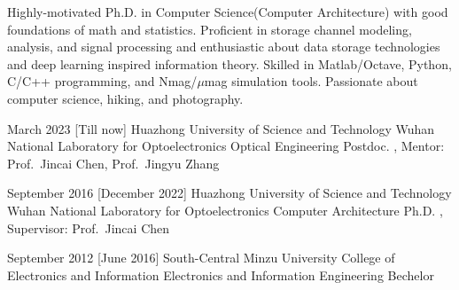 \documentclass[en]{resume}
\begin{document}
\makeheader

Highly-motivated Ph.D. in Computer Science(Computer Architecture)
with good foundations of math and statistics.
Proficient in storage channel modeling, analysis, and signal processing
and enthusiastic about data storage technologies and deep learning inspired information theory.
Skilled in Matlab/Octave, Python, C/C++ programming, and Nmag/$\mu$mag simulation tools.
Passionate about computer science, hiking, and photography.


\begin{educations}
  \education%
  {March 2023}%
    [Till now]%
    {Huazhong University of Science and Technology}%
    {Wuhan National Laboratory for Optoelectronics}%
    {Optical Engineering}%
    {Postdoc.}%
    {, Mentor: Prof.~Jincai Chen, Prof.~Jingyu Zhang}%

  \separator{0.5ex}
  \education%
    {September 2016}%
    [December 2022]%
    {Huazhong University of Science and Technology}%
    {Wuhan National Laboratory for Optoelectronics}%
    {Computer Architecture}%
    {Ph.D.}%
    {, Supervisor: Prof.~Jincai Chen}%

    \separator{0.5ex}
  \education%
    {September 2012}%
    [June 2016]%
    {South-Central Minzu University}%
    {College of Electronics and Information}%
    {Electronics and Information Engineering}%
    {Bechelor}%
    {}%

\end{educations}
\end{document}
